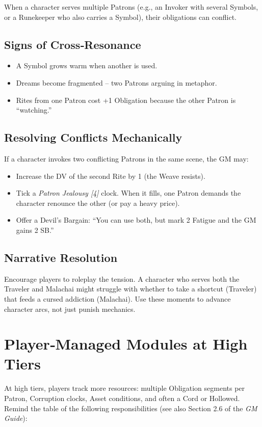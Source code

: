 When a character serves multiple Patrons (e.g., an Invoker with several Symbols, or a Runekeeper who also carries a Symbol), their obligations can conflict.

\subsection*{Signs of Cross‑Resonance}
\begin{itemize}
  \item A Symbol grows warm when another is used.
  \item Dreams become fragmented – two Patrons arguing in metaphor.
  \item Rites from one Patron cost +1 Obligation because the other Patron is “watching.”
\end{itemize}

\subsection*{Resolving Conflicts Mechanically}
If a character invokes two conflicting Patrons in the same scene, the GM may:
\begin{itemize}
  \item Increase the DV of the second Rite by 1 (the Weave resists).
  \item Tick a \emph{Patron Jealousy [4]} clock. When it fills, one Patron demands the character renounce the other (or pay a heavy price).
  \item Offer a Devil’s Bargain: “You can use both, but mark 2 Fatigue and the GM gains 2 SB.”
\end{itemize}

\subsection*{Narrative Resolution}
Encourage players to roleplay the tension. A character who serves both the Traveler and Malachai might struggle with whether to take a shortcut (Traveler) that feeds a cursed addiction (Malachai). Use these moments to advance character arcs, not just punish mechanics.

\section{Player‑Managed Modules at High Tiers}

At high tiers, players track more resources: multiple Obligation segments per Patron, Corruption clocks, Asset conditions, and often a Cord or Hollowed. Remind the table of the following responsibilities (see also Section 2.6 of the \textit{GM Guide}):

